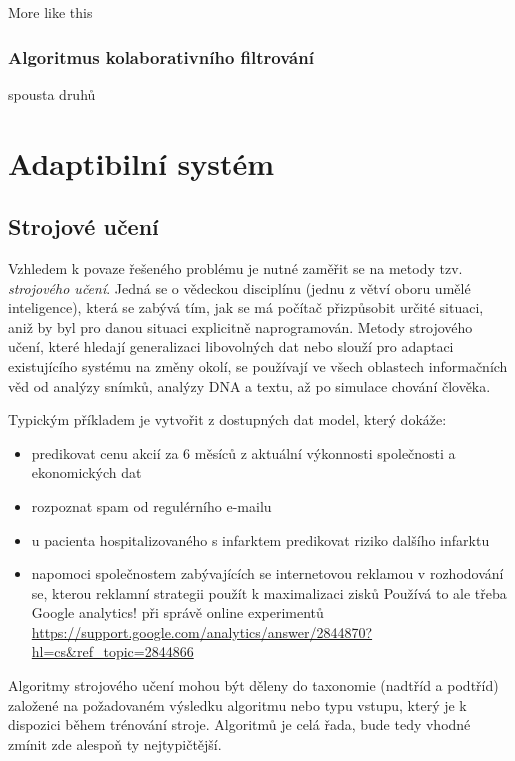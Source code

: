 \documentclass[thesis=M,czech]{FITthesis}[2014/05/07]
\begin{document}
More like this

\subsection{Algoritmus kolaborativního filtrování}

spousta druhů

\chapter{Adaptibilní systém}
\label{chap:adapt}

\section{Strojové učení}

Vzhledem k povaze řešeného problému je nutné zaměřit se na metody tzv. \emph{strojového učení}. 
Jedná se o vědeckou disciplínu (jednu z větví oboru umělé inteligence), která se zabývá tím, jak se má počítač přizpůsobit určité situaci, aniž by byl pro danou situaci explicitně naprogramován. Metody strojového učení, které hledají generalizaci libovolných dat nebo slouží pro adaptaci existujícího systému na změny okolí, se používají ve všech oblastech informačních věd od analýzy snímků, analýzy DNA a textu, až po simulace chování člověka. 

Typickým příkladem je vytvořit z dostupných dat model, který dokáže:

\begin{itemize}
  \item predikovat cenu akcií za 6 měsíců z aktuální výkonnosti společnosti a ekonomických dat
  \item rozpoznat spam od regulérního e-mailu
  \item u pacienta hospitalizovaného s infarktem predikovat riziko dalšího infarktu
  \item napomoci společnostem zabývajících se internetovou reklamou v rozhodování se, kterou reklamní strategii použít k maximalizaci zisků
  Používá to ale třeba Google analytics! při správě online experimentů
\url{https://support.google.com/analytics/answer/2844870?hl=cs&ref_topic=2844866}
\end{itemize}

Algoritmy strojového učení mohou být děleny do taxonomie (nadtříd a podtříd) založené na požadovaném výsledku algoritmu nebo typu vstupu, který je k dispozici během trénování stroje. Algoritmů je celá řada, bude tedy vhodné zmínit zde alespoň ty nejtypičtější. 
\end{document}
